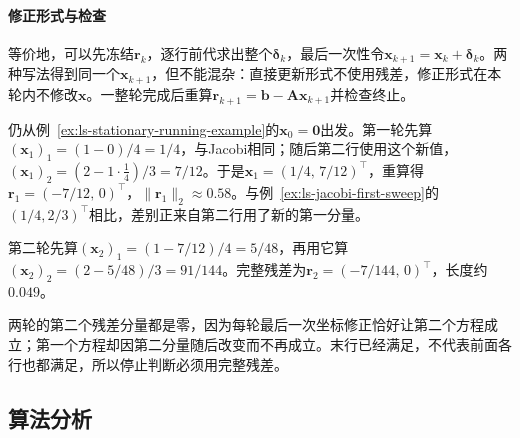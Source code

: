 \paragraph{修正形式与检查}
等价地，可以先冻结$\bm r_k$，逐行前代求出整个$\bm\delta_k$，最后一次性令$\bm x_{k+1}=\bm x_k+\bm\delta_k$。两种写法得到同一个$\bm x_{k+1}$，但不能混杂：直接更新形式不使用残差，修正形式在本轮内不修改$\bm x$。一整轮完成后重算$\bm r_{k+1}=\bm b-\bm A\bm x_{k+1}$并检查终止。

\begin{example}
\label{ex:ls-gauss-seidel-first-sweep}
仍从例~\ref{ex:ls-stationary-running-example}的$\bm x_0=\bm 0$出发。第一轮先算$(\bm x_1)_1=(1-0)/4=1/4$，与Jacobi相同；随后第二行使用这个新值，$(\bm x_1)_2=(2-1\cdot\tfrac14)/3=7/12$。于是$\bm x_1=(1/4,\,7/12)^\top$，重算得$\bm r_1=(-7/12,\,0)^\top$，$\lVert\bm r_1\rVert_2\approx0.58$。与例~\ref{ex:ls-jacobi-first-sweep}的$(1/4,2/3)^\top$相比，差别正来自第二行用了新的第一分量。

第二轮先算$(\bm x_2)_1=(1-7/12)/4=5/48$，再用它算$(\bm x_2)_2=(2-5/48)/3=91/144$。完整残差为$\bm r_2=(-7/144,\,0)^\top$，长度约$0.049$。

两轮的第二个残差分量都是零，因为每轮最后一次坐标修正恰好让第二个方程成立；第一个方程却因第二分量随后改变而不再成立。末行已经满足，不代表前面各行也都满足，所以停止判断必须用完整残差。
\end{example}

\subsection{算法分析}

